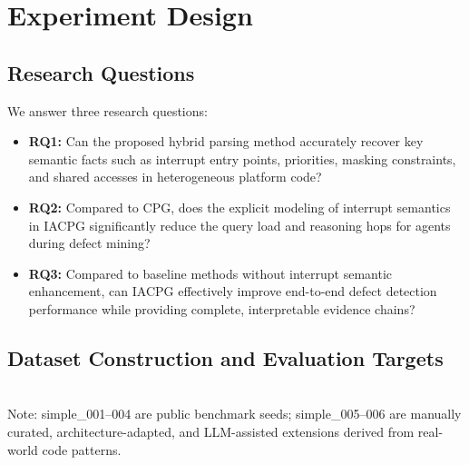 \documentclass[conference]{IEEEtran}
\newcommand{\iacpg}{IACPG\xspace}
\begin{document}
\FloatBarrier
\section{Experiment Design}

\subsection{Research Questions}

We answer three research questions:
\begin{itemize}
  \item \textbf{RQ1:} Can the proposed hybrid parsing method accurately recover key semantic facts such as interrupt entry points, priorities, masking constraints, and shared accesses in heterogeneous platform code?
  \item \textbf{RQ2:} Compared to CPG, does the explicit modeling of interrupt semantics in \iacpg significantly reduce the query load and reasoning hops for agents during defect mining?
  \item \textbf{RQ3:} Compared to baseline methods without interrupt semantic enhancement, can \iacpg effectively improve end-to-end defect detection performance while providing complete, interpretable evidence chains?
\end{itemize}

\subsection{Dataset Construction and Evaluation Targets}

\begin{table}[!t]
  \centering
  \caption{Benchmark statistics by defect type (96 instances, 4 ISAs $\times$ 24 templates).}
  \label{tab:dataset_src}
  \\[4pt]
  \footnotesize{Note: simple\_001--004 are public benchmark seeds; simple\_005--006 are manually curated, architecture-adapted, and LLM-assisted extensions derived from real-world code patterns.}
\end{table}
\end{document}

